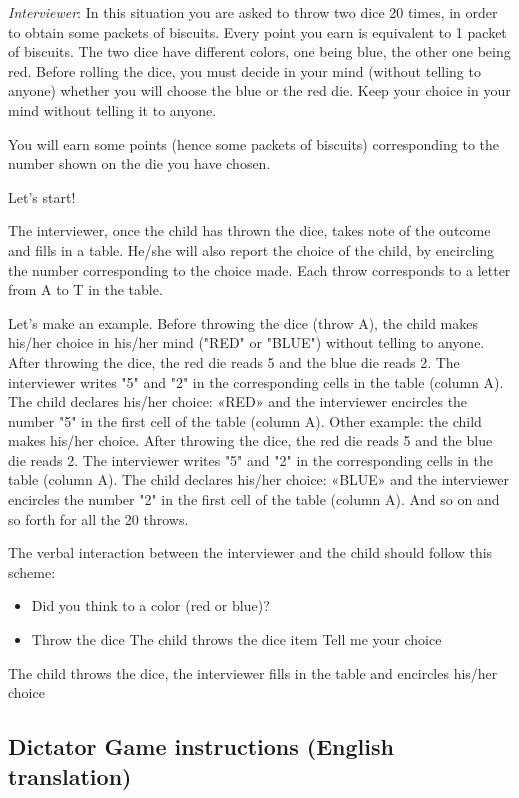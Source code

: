 \documentclass[authoryear, preprint, review, 12pt]{elsarticle}
\begin{document}
\textit{Interviewer}: 
In this situation you are asked to throw two dice 20 times, in order to obtain some packets of biscuits. Every point you earn is equivalent to 1 packet of biscuits. The two dice have different colors, one being blue, the other one being red. Before rolling the dice, you must decide in your mind (without telling to anyone) whether you will choose the blue or the red die. Keep your choice in your mind without telling it to anyone.

You will earn some points (hence some packets of biscuits) corresponding to the number shown on the die you have chosen.

Let's start!

The interviewer, once the child has thrown the dice, takes note of the outcome and fills in a table. He/she will also report the choice of the child, by encircling the number corresponding to the choice made. Each throw corresponds to a letter from A to T in the table.

Let's make an example. 
Before throwing the dice (throw A), the child makes his/her choice in his/her mind ("RED" or "BLUE") without telling to anyone. After throwing the dice, the red die reads 5 and the blue die reads 2. The interviewer writes "5" and "2" in the corresponding cells in the table (column A). The child declares his/her choice: «RED» and the interviewer encircles the number "5" in the first cell of the table (column A). 
Other example: the child makes his/her choice. After throwing the dice, the red die reads 5 and the blue die reads 2. The interviewer writes "5" and "2" in the corresponding cells in the table (column A). The child declares his/her choice: «BLUE» and the interviewer encircles the number "2" in the first cell of the table (column A). 
And so on and so forth for all the 20 throws.

The verbal interaction between the interviewer and the child should follow this scheme:

\begin{itemize}
    \item Did you think to a color (red or blue)?
    \item Throw the dice
    The child throws the dice
    item Tell me your choice
\end{itemize}

The child throws the dice, the interviewer fills in the table and encircles his/her choice

\subsection{Dictator Game instructions (English translation)}
\end{document}
